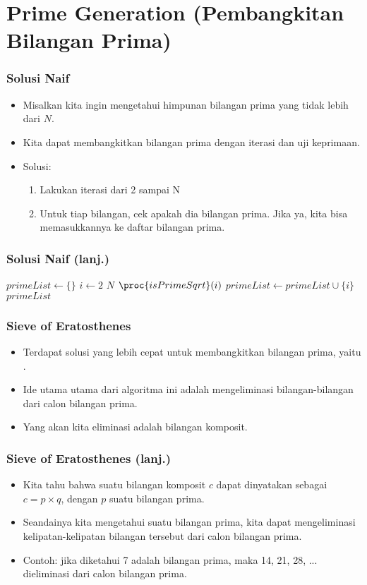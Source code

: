\section{Prime Generation \newline (Pembangkitan Bilangan Prima)}
\frame{\sectionpage}

\begin{frame}
\frametitle{Solusi Naif}
\begin{itemize}
  \item Misalkan kita ingin mengetahui himpunan bilangan prima yang tidak lebih dari $N$.
  \item Kita dapat membangkitkan bilangan prima dengan iterasi dan uji keprimaan.
  \item Solusi: 
  \begin{enumerate}
    \item Lakukan iterasi dari 2 sampai N
    \item Untuk tiap bilangan, cek apakah dia bilangan prima. Jika ya, kita bisa memasukkannya ke daftar bilangan prima.
  \end{enumerate}
\end{itemize}
\end{frame}

\begin{frame}
\frametitle{Solusi Naif (lanj.)}
\begin{codebox}
\li $primeList \gets \{\}$
\li \For $i \gets 2$ \To $N$
    \Do
\li   \If $\proc{isPrimeSqrt}(i)$
      \Then
\li     $primeList \gets primeList \cup \{i\}$
      \End    
    \End
\li \Return $primeList$
\end{codebox}
\end{frame}

\begin{frame}
\frametitle{Sieve of Eratosthenes}
\begin{itemize}
  \item Terdapat solusi yang lebih cepat untuk membangkitkan bilangan prima, yaitu .
  \item Ide utama utama dari algoritma ini adalah mengeliminasi bilangan-bilangan dari calon bilangan prima.
  \item Yang akan kita eliminasi adalah bilangan komposit.
\end{itemize}
\end{frame}

\begin{frame}
\frametitle{Sieve of Eratosthenes (lanj.)}
\begin{itemize}
  \item Kita tahu bahwa suatu bilangan komposit $c$ dapat dinyatakan sebagai $c = p \times q$, dengan $p$ suatu bilangan prima.
  \item Seandainya kita mengetahui suatu bilangan prima, kita dapat mengeliminasi kelipatan-kelipatan bilangan tersebut dari calon bilangan prima.
  \item Contoh: jika diketahui 7 adalah bilangan prima, maka 14, 21, 28, ... dieliminasi dari calon bilangan prima.
\end{itemize}
\end{frame}

